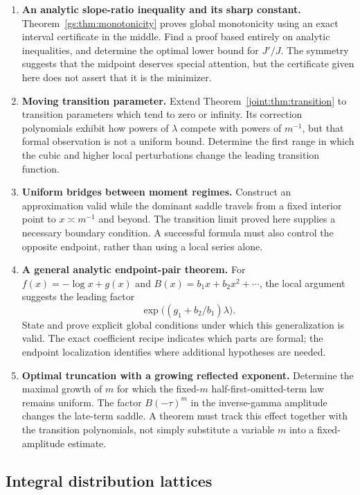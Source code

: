 \documentclass[11pt,a4paper]{article}
\numberwithin{equation}{section}
\theoremstyle{plain}
\theoremstyle{definition}
\theoremstyle{remark}
\begin{document}
\begin{enumerate}[leftmargin=*,label=M\arabic*.]
\item \textbf{An analytic slope-ratio inequality and its sharp
constant.} Theorem~\ref{gs:thm:monotonicity} proves global
monotonicity using an exact interval certificate in the middle.
Find a proof based entirely on analytic inequalities, and determine
the optimal lower bound for $J'/J$. The symmetry suggests that
the midpoint deserves special attention, but the certificate given
here does not assert that it is the minimizer.

\item \textbf{Moving transition parameter.} Extend
Theorem~\ref{joint:thm:transition} to transition parameters which
tend to zero or infinity. Its correction polynomials exhibit
how powers of $\lambda$ compete with powers of $m^{-1}$, but
that formal observation is not a uniform bound. Determine the
first range in which the cubic and higher local perturbations
change the leading transition function.

\item \textbf{Uniform bridges between moment regimes.}
Construct an approximation valid while the dominant saddle
travels from a fixed interior point to $x\asymp m^{-1}$ and
beyond. The transition limit proved here supplies a necessary
boundary condition. A successful formula must also control the
opposite endpoint, rather than using a local series alone.

\item \textbf{A general analytic endpoint-pair theorem.}
For $f(x)=-\log x+g(x)$ and
$B(x)=b_1x+b_2x^2+\cdots$, the local argument suggests the
leading factor
\[
 \exp\bigl((g_1+b_2/b_1)\lambda\bigr).
\]
State and prove explicit global conditions under which this
generalization is valid. The exact coefficient recipe indicates
which parts are formal; the endpoint localization identifies
where additional hypotheses are needed.

\item \textbf{Optimal truncation with a growing reflected
exponent.} Determine the maximal growth of $m$ for which the
fixed-$m$ half-first-omitted-term law remains uniform. The factor
$B(-\tau)^m$ in the inverse-gamma amplitude changes the late-term
saddle. A theorem must track this effect together with the
transition polynomials, not simply substitute a variable $m$
into a fixed-amplitude estimate.
\end{enumerate}

\subsection{Integral distribution lattices}
\end{document}

